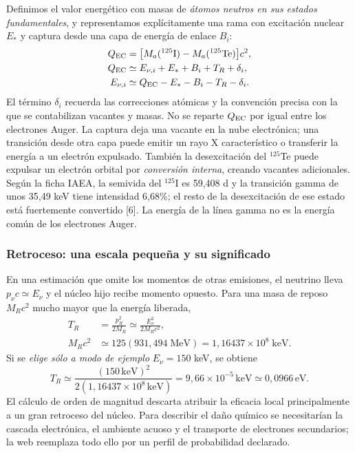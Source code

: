 \documentclass[11pt,a4paper,oneside]{article}
\begin{document}
Definimos el valor energético con masas de \emph{átomos neutros en sus estados
fundamentales}, y representamos explícitamente una rama con excitación nuclear
$E_*$ y captura desde una capa de energía de enlace $B_i$:
\begin{align}
Q_{\rm EC}&=\big[M_a({}^{125}\mathrm I)-M_a({}^{125}\mathrm{Te})\big]c^2,\\
Q_{\rm EC}&\simeq E_{\nu,i}+E_*+B_i+T_R+\delta_i,\\
E_{\nu,i}&\simeq Q_{\rm EC}-E_*-B_i-T_R-\delta_i.
\end{align}
El término $\delta_i$ recuerda las correcciones atómicas y la convención
precisa con la que se contabilizan vacantes y masas. No se reparte $Q_{\rm EC}$
por igual entre los electrones Auger. La captura deja una vacante en la nube
electrónica; una transición desde otra capa puede emitir un rayo X
característico o transferir la energía a un electrón expulsado. También la
desexcitación del $^{125}$Te puede expulsar un electrón orbital por
\emph{conversión interna}, creando vacantes adicionales. Según la ficha IAEA,
la semivida del $^{125}$I es 59,408 d y la transición gamma de unos 35,49 keV
tiene intensidad 6,68\%; el resto de la desexcitación de ese estado está
fuertemente convertido [6]. La energía de la línea gamma no es la energía
común de los electrones Auger.

\subsubsection{Retroceso: una escala pequeña y su significado}
En una estimación que omite los momentos de otras emisiones, el neutrino lleva
$p_\nu c\simeq E_\nu$ y el núcleo hijo recibe momento opuesto. Para una masa
de reposo $M_R c^2$ mucho mayor que la energía liberada,
\begin{align}
T_R&=\frac{p_R^2}{2M_R}\simeq\frac{E_\nu^2}{2M_Rc^2},\\
M_Rc^2&\simeq125(931{,}494\;\mathrm{MeV})
       =1{,}16437\times10^8\;\mathrm{keV}.
\end{align}
Si se \emph{elige sólo a modo de ejemplo} $E_\nu=150$ keV, se obtiene
\[
T_R\simeq\frac{(150\,\mathrm{keV})^2}
 {2(1{,}16437\times10^8\,\mathrm{keV})}
 =9{,}66\times10^{-5}\,\mathrm{keV}\simeq0{,}0966\,\mathrm{eV}.
\]
El cálculo de orden de magnitud descarta atribuir la eficacia local
principalmente a un gran retroceso del núcleo. Para describir el daño químico
se necesitarían la cascada electrónica, el ambiente acuoso y el transporte
de electrones secundarios; la web reemplaza todo ello por un perfil de
probabilidad declarado.
\end{document}
